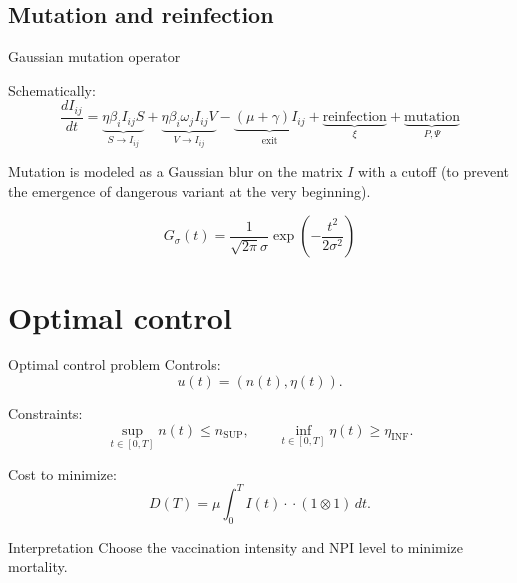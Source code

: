 \documentclass[
11pt,notheorems,hyperref={pdfauthor=whatever}
]{beamer}
\begin{document}
\subsection{Mutation and reinfection}

\begin{frame}{Gaussian mutation operator}

	Schematically:
	\[
		\frac{dI_{ij}}{dt}
		=
		\underbrace{\eta \beta_i I_{ij} S}_{S\to I_{ij}}
		+
		\underbrace{\eta \beta_i \omega_j I_{ij} V}_{V\to I_{ij}}
		-
		\underbrace{(\mu+\gamma)I_{ij}}_{\text{exit}}
		+
		\underbrace{\text{reinfection}}_{\xi}
		+
		\underbrace{\text{mutation}}_{P,\Psi}
	\]

	Mutation is modeled as a Gaussian blur on the matrix \(I\) with a cutoff (to prevent the emergence of dangerous variant at the very beginning).

	\[
		G_\sigma(t)=\frac{1}{\sqrt{2\pi}\sigma}\exp\!\left(-\frac{t^2}{2\sigma^2}\right)
	\]


\end{frame}

%
%



\section{Optimal control}

\begin{frame}{Optimal control problem}
	Controls:
	\[
		u(t)=(n(t),\eta(t)).
	\]

	Constraints:
	\[
		\sup_{t\in[0,T]} n(t)\le n_{\mathrm{SUP}},
		\qquad
		\inf_{t\in[0,T]} \eta(t)\ge \eta_{\mathrm{INF}}.
	\]

	Cost to minimize:
	\[
		D(T)=\mu\int_0^T I(t)\cdot\!\cdot(1\otimes 1)\,dt.
	\]

	\begin{block}{Interpretation}
		Choose the vaccination intensity and NPI level to minimize mortality.
	\end{block}
\end{frame}
\end{document}
